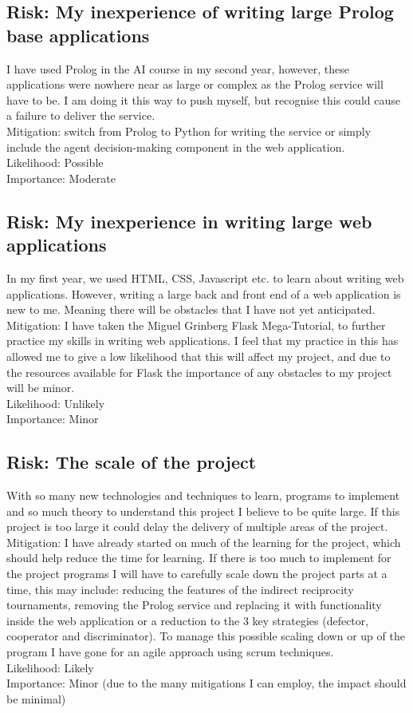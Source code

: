 \documentclass{article}
\begin{document}
\subsection*{Risk: My inexperience of writing large Prolog base applications}
I have used Prolog in the AI course in my second year, however, these applications were nowhere near as large or complex as the Prolog service will have to be. I am doing it this way to push myself, but recognise this could cause a failure to deliver the service.\\
Mitigation: switch from Prolog to Python for writing the service or simply include the agent decision-making component in the web application.\\
Likelihood: Possible\\
Importance: Moderate

\subsection*{Risk: My inexperience in writing large web applications}
In my first year, we used HTML, CSS, Javascript etc. to learn about writing web applications. However, writing a large back and front end of a web application is new to me. Meaning there will be obstacles that I have not yet anticipated. \\
Mitigation: I have taken the Miguel Grinberg Flask Mega-Tutorial, to further practice my skills in writing web applications. I feel that my practice in this has allowed me to give a low likelihood that this will affect my project, and due to the resources available for Flask the importance of any obstacles to my project will be minor.\\
Likelihood: Unlikely\\
Importance: Minor

\subsection*{Risk: The scale of the project}
With so many new technologies and techniques to learn, programs to implement and so much theory to understand this project I believe to be quite large. If this project is too large it could delay the delivery of multiple areas of the project.\\
Mitigation: I have already started on much of the learning for the project, which should help reduce the time for learning. If there is too much to implement for the project programs I will have to carefully scale down the project parts at a time, this may include: reducing the features of the indirect reciprocity tournaments, removing the Prolog service and replacing it with functionality inside the web application or a reduction to the 3 key strategies (defector, cooperator and discriminator). To manage this possible scaling down or up of the program I have gone for an agile approach using scrum techniques.\\
Likelihood: Likely\\
Importance: Minor (due to the many mitigations I can employ, the impact should be minimal)
\end{document}
